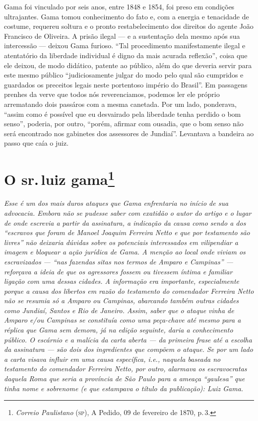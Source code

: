 \begin{argumento}
{Gama foi vinculado por seis anos, entre 1848 e 1854, foi preso em
condições ultrajantes. Gama tomou conhecimento do fato e, com a energia
e tenacidade de costume, requereu soltura e o pronto restabelecimento
dos direitos do agente João Francisco de Oliveira. A prisão ilegal --- e
a sustentação dela mesmo após sua intercessão --- deixou Gama furioso.
``Tal procedimento manifestamente ilegal e atentatório da liberdade
individual é digno da mais acurada reflexão'', coisa que ele deixou, de
modo didático, patente ao público, além do que deveria servir para este
mesmo público ``judiciosamente julgar do modo pelo qual são cumpridos e
guardados os preceitos legais neste portentoso império do Brasil''. Em
passagens prenhes da verve que todos nós reverenciamos, podemos ler ele
próprio arrematando dois passáros com a mesma canetada. Por um lado,
ponderava, ``assim como é possível que eu desvairado pela liberdade tenha
perdido o bom senso'', poderia, por outro, ``porém, afirmar com ousadia,
que o bom senso não será encontrado nos gabinetes dos assessores de
Jundiaí''. Levantava a bandeira ao passo que caía o juiz.}
\end{argumento}

\chapter{O sr.\,luiz gama\footnote{\emph{Correio Paulistano} (\textsc{sp}), A Pedido, 09 de fevereiro de 1870,
  p.\,3.}} %

\begin{didascalia}
\emph{Esse é um dos mais duros ataques que Gama enfrentaria no início de
sua advocacia. Embora não se pudesse saber com exatidão o autor do
artigo e o lugar de onde escrevia a partir da assinatura, a indicação da
causa como sendo a dos ``escravos que foram de Manoel Joaquim Ferreira
Netto e que por testamento são livres'' não deixaria dúvidas sobre os
potenciais interessados em vilipendiar a imagem e bloquear a ação
jurídica de Gama. A menção ao local onde viviam os escravizados --- ``nas
fazendas sitas nos termos de Amparo e Campinas'' --- reforçava a ideia de
que os agressores fossem ou tivessem íntima e familiar ligação com uma
dessas cidades. A informação era importante, especialmente porque a
causa dos libertos em razão do testamento do comendador Ferreira Netto
não se resumia só a Amparo ou Campinas, abarcando também outras cidades
como Jundiaí, Santos e Rio de Janeiro. Assim, saber que o ataque vinha
de Amparo e/ou Campinas se constituía como uma peça-chave até mesmo para
a réplica que Gama sem demora, já na edição seguinte, daria a
conhecimento público. O escárnio e a malícia da carta aberta --- da
primeira frase até a escolha da assinatura --- são dois dos ingredientes
que compõem o ataque. Se por um lado a carta visava influir em uma causa
específica, i.e., naquela baseada no testamento do comendador Ferreira
Netto, por outro, alarmava os escravocratas daquela Roma que seria a
província de São Paulo para a ameaça ``gaulesa'' que tinha nome e sobrenome
(e que estampava o título da publicação): Luiz Gama.}
\end{didascalia}



